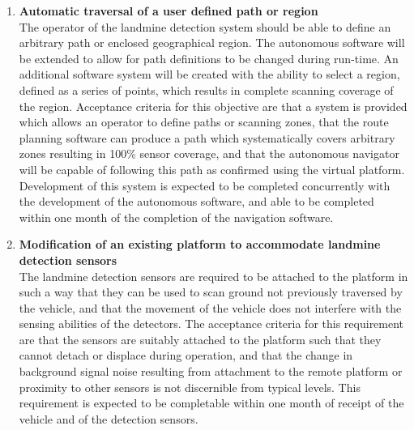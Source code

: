\documentclass[main.tex]{subfiles}
\begin{document}
\begin{enumerate}
\item \textbf{Automatic traversal of a user defined path or region}\\ 
The operator of the landmine detection system should be able to define an arbitrary path or enclosed geographical region. 
The autonomous software will be extended to allow for path definitions to be changed during run-time. 
An additional software system will be created with the ability to select a region, defined as a series of points, which results in complete scanning coverage of the region.
Acceptance criteria for this objective are that a system is provided which allows an operator to define paths or scanning zones, that the route planning software can produce a path which systematically covers arbitrary zones resulting in 100\% sensor coverage, and that the autonomous navigator will be capable of following this path as confirmed using the virtual platform.
Development of this system is expected to be completed concurrently with the development of the autonomous software, and able to be completed within one month of the completion of the navigation software.

\item \textbf{Modification of an existing platform to accommodate landmine detection sensors}\\ 
The landmine detection sensors are required to be attached to the platform in such a way that they can be used to scan ground not previously traversed by the vehicle, and that the movement of the vehicle does not interfere with the sensing abilities of the detectors. 
The acceptance criteria for this requirement are that the sensors are suitably attached to the platform such that they cannot detach or displace during operation, and that the change in background signal noise resulting from attachment to the remote platform or proximity to other sensors is not discernible from typical levels. 
This requirement is expected to be completable within one month of receipt of the vehicle and of the detection sensors.


\end{enumerate}
\end{document}

